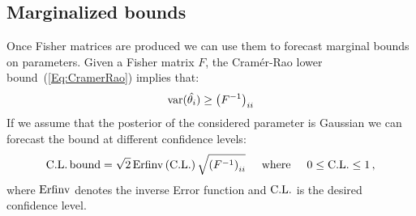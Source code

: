 \documentclass[prd,nofootinbib,showpacs]{revtex4}
\begin{document}
\subsection{Marginalized bounds}
%
Once Fisher matrices are produced we can use them to forecast marginal bounds on parameters.
%
Given a Fisher matrix $F$, the Cram\'er-Rao lower bound~(\ref{Eq:CramerRao}) implies that:
%
\begin{align}
{\rm var} ( \hat{\theta_i} ) \geq \left( F^{-1} \right)_{ii}
\end{align}
%
If we assume that the posterior of the considered parameter is Gaussian we can forecast the bound at different confidence levels:
%
\begin{align}
{\rm C.L. \, bound} = \sqrt{2} \, {\rm Erfinv}\left( {\rm C.L.} \right) \sqrt{ \left( F^{-1} \right)_{ii} } \hspace{0.5cm}{\rm where}\hspace{0.5cm} 0\leq {\rm C.L.} \leq 1 \,,
\end{align}
%
where ${\rm Erfinv}$ denotes the inverse Error function and ${\rm C.L.}$ is the desired confidence level.

%
\end{document}
